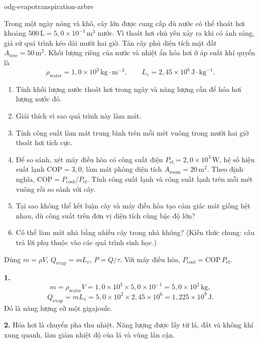 \begin{exo}{odg-evapotranspiration-arbre}

Trong một ngày nóng và khô, cây lớn được cung cấp đủ nước có thể thoát hơi khoảng $500\,\text{L}=5{,}0\times10^{-1}\,\text{m}^3$ nước. Vì thoát hơi chủ yếu xảy ra khi có ánh sáng, giả sử quá trình kéo dài mười hai giờ. Tán cây phủ diện tích mặt đất $A_{\text{tree}}=50\,\text{m}^2$. Khối lượng riêng của nước và nhiệt ẩn hóa hơi ở áp suất khí quyển là
\[
\rho_{\text{water}}=1{,}0\times10^3\,\text{kg}\!\cdot\!\text{m}^{-3},
\qquad L_v=2{,}45\times10^6\,\text{J}\!\cdot\!\text{kg}^{-1}.
\]
\begin{enumerate}
  \item Tính khối lượng nước thoát hơi trong ngày và năng lượng cần để hóa hơi lượng nước đó.
  \item Giải thích vì sao quá trình này làm mát.
  \item Tính công suất làm mát trung bình trên mỗi mét vuông trong mười hai giờ thoát hơi tích cực.
  \item Để so sánh, xét máy điều hòa có công suất điện $P_{\mathrm{el}}=2{,}0\times10^3\,\text{W}$, hệ số hiệu suất lạnh $\mathrm{COP}=3{,}0$, làm mát phòng diện tích $A_{\text{room}}=20\,\text{m}^2$. Theo định nghĩa, $\mathrm{COP}=P_{\text{cool}}/P_{\mathrm{el}}$. Tính công suất lạnh và công suất lạnh trên mỗi mét vuông rồi so sánh với cây.
  \item Tại sao không thể kết luận cây và máy điều hòa tạo cảm giác mát giống hệt nhau, dù công suất trên đơn vị diện tích cùng bậc độ lớn?
  \item Có thể làm mát nhà bằng nhiều cây trong nhà không? (Kiến thức chung: câu trả lời phụ thuộc vào các quá trình sinh học.)
\end{enumerate}
\begin{indication}
Dùng $m=\rho V$, $Q_{\mathrm{evap}}=mL_v$, $P=Q/\tau$. Với máy điều hòa, $P_{\text{cool}}=\mathrm{COP}\,P_{\mathrm{el}}$.
\end{indication}
\begin{solution}
\textbf{1.}
\[
m=\rho_{\text{water}}V=1{,}0\times10^3\times5{,}0\times10^{-1}
=5{,}0\times10^2\,\text{kg},
\]
\[
Q_{\mathrm{evap}}=mL_v=5{,}0\times10^2\times2{,}45\times10^6
=1{,}225\times10^9\,\text{J}.
\]
Đó là năng lượng cỡ một gigajoule.

\textbf{2.} Hóa hơi là chuyển pha thu nhiệt. Năng lượng được lấy từ lá, đất và không khí xung quanh, làm giảm nhiệt độ của lá và vùng lân cận.


\end{solution}
\end{exo}
